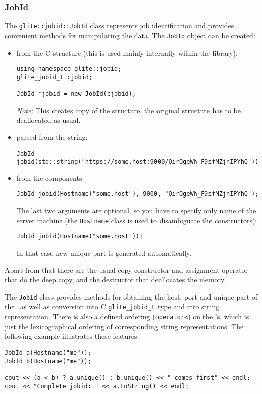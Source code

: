 \subsubsection{JobId}
The \verb'glite::jobid::JobId' class represents job identification and
provides convenient methods for manipulating the data. The
\verb'JobId' object can be created:
\begin{itemize}
\item from the C structure (this is used mainly internally within the
library):
\begin{lstlisting}
using namespace glite::jobid;
glite_jobid_t cjobid;

JobId *jobid = new JobId(cjobid);
\end{lstlisting}
\emph{Note:} This creates copy of the structure, the original structure has to be
deallocated as usual.
\item parsed from the string:
\begin{lstlisting}
JobId jobid(std::string("https://some.host:9000/OirOgeWh_F9sfMZjnIPYhQ"));
\end{lstlisting}
\item from the components:
\begin{lstlisting}
JobId jobid(Hostname("some.host"), 9000, "OirOgeWh_F9sfMZjnIPYhQ");
\end{lstlisting}
The last two arguments are optional, so you have to specify only
name of the \LB server machine (the \verb'Hostname' class is used to
disambiguate the constructors):
\begin{lstlisting}
JobId jobid(Hostname("some.host"));
\end{lstlisting}
In that case new unique part is generated automatically.
\end{itemize}
Apart from that there are the usual copy constructor and assignment
operator that do the deep copy, and the destructor that deallocates
the memory.

%
The \verb'JobId' class provides methods for obtaining the host, port
and unique part of the \jobid\ as well as conversion into C
\verb'glite_jobid_t' type and into string representation. There is
also a defined ordering (\verb'operator<') on the \jobid's, which is just the
lexicographical ordering of corresponding string
representations. The following example illustrates these features:

\begin{lstlisting}
JobId a(Hostname("me"));
JobId b(Hostname("me"));

cout << (a < b) ? a.unique() : b.unique() << " comes first" << endl;
cout << "Complete jobid: " << a.toString() << endl;
\end{lstlisting}

